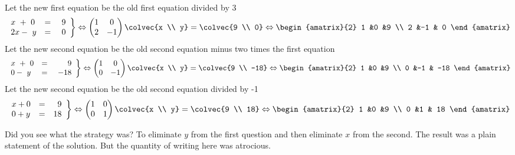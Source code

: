 \begin{example}
\begin{eqnarray*}
  \end{eqnarray*}
Let the new first equation be the old first equation divided by 3
 \begin{eqnarray*}
   \left.
\begin{array}{lcr}
	x\ +\ 0 & = & 9 \\
	2x-\ y & = &\  0 
     \end{array}
   \right\} 
   \Leftrightarrow
    \begin{pmatrix}
      1             &0  \\
      2             &-1
    \end{pmatrix}
  \colvec{x \\ y}
  =
  \colvec{9 \\ 0}
  \Leftrightarrow
 \begin{amatrix}{2}
1 &0 &9 \\ 2 &-1 & 0
\end{amatrix}
  \end{eqnarray*}
Let the new second equation be the old second equation minus two times the first equation 
\begin{eqnarray*}
   \left.
\begin{array}{lcr}
	x\ +\ 0 & = & 9 \\
	0-\ y & = &\  -18
     \end{array}
   \right\} 
   \Leftrightarrow
    \begin{pmatrix}
      1             &0  \\
      0             &-1
    \end{pmatrix}
  \colvec{x \\ y}
  =
  \colvec{9 \\ -18}
  \Leftrightarrow
 \begin{amatrix}{2}
1 &0 &9 \\ 0 &-1 & -18
\end{amatrix}
  \end{eqnarray*}
Let the new  second equation be the old second equation divided by -1
\begin{eqnarray*}
   \left.
\begin{array}{lcr}
	x + 0 & = & \ 9 \\
	0 + y & = &  18
     \end{array}
   \right\} 
   \Leftrightarrow
    \begin{pmatrix}
      1             &0  \\
      0             &1
    \end{pmatrix}
  \colvec{x \\ y}
  =
  \colvec{9 \\ 18}
  \Leftrightarrow
 \begin{amatrix}{2}
1 &0 &9 \\ 0 &1 & 18
\end{amatrix}
  \end{eqnarray*}
\end{example}
Did you see what the strategy was? To eliminate $y$ from the first question and then eliminate $x$ from the second. The result was a plain statement of the solution. But the quantity of writing here was atrocious. 

